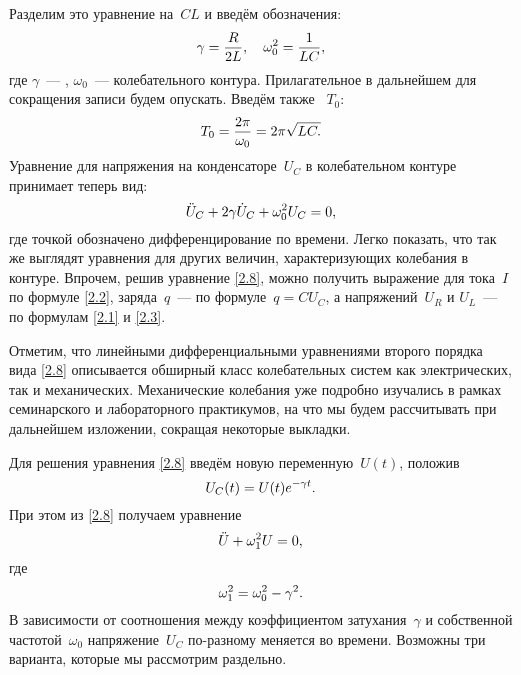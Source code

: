 Разделим это уравнение на~$CL$ и введём обозначения:
\begin{equation}\eqmark{2.6}
\gamma=\dfrac{R}{2L},~~~\omega_0^2=\dfrac{1}{LC},
\end{equation}
где $\gamma$~--- ,
$\omega_0$~---  колебательного контура.
Прилагательное   в дальнейшем для сокращения записи
будем опускать. Введём также  ~$T_0$:
\begin{equation}\eqmark{2.7}
T_0=\dfrac{2\pi}{\omega_0}=2\pi\sqrt{LC.}
\end{equation}
Уравнение для напряжения на конденсаторе~$U_C$ в колебательном контуре принимает
теперь вид:
\begin{equation}\eqmark{2.8}
\ddot{U}_C+2\gamma\dot{U}_C+\omega_0^2U_C=0,
\end{equation}
где точкой обозначено дифференцирование по времени. Легко показать, что так же
выглядят уравнения для других величин, характеризующих колебания в контуре.
Впрочем, решив уравнение \eqref{2.8}, можно получить выражение для тока~$I$ по
формуле \eqref{2.2}, заряда~$q$~--- по формуле~$q=CU_C$, а напряжений~$U_R$ и
$U_L$~--- по формулам \eqref{2.1} и \eqref{2.3}.

Отметим, что линейными дифференциальными уравнениями второго порядка вида
\eqref{2.8} описывается обширный класс колебательных систем как электрических,
так и механических. Механические колебания уже подробно изучались в рамках
семинарского и лабораторного практикумов, на что мы будем рассчитывать при
дальнейшем изложении, сокращая некоторые выкладки.

Для решения уравнения \eqref{2.8} введём новую переменную~$U(t)$, положив
\begin{equation}\eqmark{2.9}
U_C(t)=U(t)e^{-\gamma t}.
\end{equation}
При этом из \eqref{2.8} получаем уравнение
\begin{equation}\eqmark{2.10}
\ddot{U}+\omega_1^2U=0,
\end{equation}
где
\begin{equation}\eqmark{2.11}
\omega_1^2=\omega_0^2-\gamma^2.
\end{equation}
В зависимости от соотношения между коэффициентом затухания~$\gamma$ и
собственной частотой~$\omega_0$ напряжение~$U_C$ по-разному меняется во времени.
Возможны три варианта, которые мы рассмотрим раздельно.


